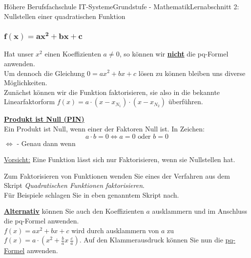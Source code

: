 \documentclass[11pt,twocolumn,oneside,openany,headings=optiontotoc,11pt,numbers=noenddot]{article}
\begin{document}
\begin{worksheet}{Höhere Berufsfachschule IT-Systeme}{Grundstufe - Mathematik}{Lernabschnitt 2: Nullstellen einer quadratischen Funktion}
		\subsubsection*{\(\mathbf{f(x) = ax^2 + bx + c}\)}
		Hat unser \(x^2\) einen Koeffizienten \(a \neq{} 0\), so können wir \underline{\textbf{nicht}} die pq-Formel anwenden.\\
		Um dennoch die Gleichung \(0 = ax^2 +bx + c\) lösen zu können bleiben uns diverse Möglichkeiten.\\
		Zunächst können wir die Funktion faktorisieren, sie also in die bekannte Linearfaktorform \(f(x) = a\cdot{}(x-x_{N_1})\cdot(x-x_{N_2})\) überführen.
		\begin{framed}
			\noindent
			\underline{\textbf{Produkt ist Null (PIN)}}\\
			Ein Produkt ist Null, wenn einer der Faktoren Null ist. In Zeichen: \[a\cdot{}b = 0 \Leftrightarrow a = 0 \text{\ oder\ } b = 0\]
			\small{\(\Leftrightarrow\) - Genau dann wenn}\normalsize
		\end{framed}
		\begin{framed}
			\noindent
			\underline{Vorsicht:} Eine Funktion lässt sich nur Faktorisieren, wenn sie Nullstellen hat.
		\end{framed}
		\noindent
		Zum Faktorisieren von Funktionen wenden Sie eines der Verfahren aus dem Skript \textit{Quadratischen Funktionen faktorisieren}.\\
		\small{Für Beispiele schlagen Sie in eben genanntem Skript nach.}\normalsize\\
		\par\noindent
		\underline{\textbf{Alternativ}} können Sie auch den Koeffizienten \(a\) ausklammern und im Anschluss die pq-Formel anwenden.\\
		\(f(x) = ax^2 + bx + c\) wird durch ausklammern von \(a\) zu \(f(x) = a\cdot{}(x^2 + \frac{b}{a}x~ \frac{c}{a})\). Auf den Klammerausdruck können Sie nun die \underline{pq-Formel} anwenden.

\end{worksheet}
\end{document}
